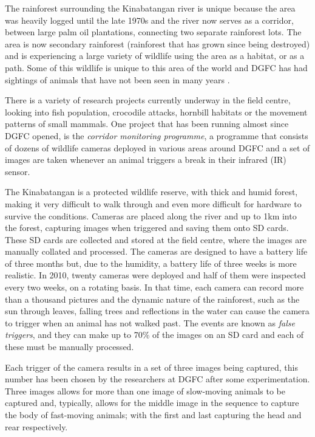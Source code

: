 The rainforest surrounding the Kinabatangan river is unique because the area was heavily logged until the late 1970s and the river now serves as a corridor, between large palm oil plantations, connecting two separate rainforest lots. The area is now secondary rainforest (rainforest that has grown since being destroyed) and is experiencing a large variety of wildlife using the area as a habitat, or as a path. Some of this wildlife is unique to this area of the world and DGFC has had sightings of animals that have not been seen in many years \cite{Goossens2012}.

There is a variety of research projects currently underway in the field centre, looking into fish population, crocodile attacks, hornbill habitats or the movement patterns of small mammals. One project that has been running almost since DGFC opened, is the \textit{corridor monitoring programme}, a programme that consists of dozens of wildlife cameras deployed in various areas around DGFC and a set of images are taken whenever an animal triggers a break in their infrared (IR)  sensor.

The Kinabatangan is a protected wildlife reserve, with thick and humid forest, making it very difficult to walk through and even more difficult for hardware to survive the conditions. Cameras are placed along the river and up to 1km into the forest, capturing images when triggered and saving them onto SD cards. These SD cards are collected and stored at the field centre, where the images are manually collated and processed. The cameras are designed to have a battery life of three months but, due to the humidity, a battery life of three weeks is more realistic. In 2010, twenty cameras were deployed and half of them were inspected every two weeks, on a rotating basis. In that time, each camera can record more than a thousand pictures and the dynamic nature of the rainforest, such as the sun through leaves, falling trees and reflections in the water can cause the camera to trigger when an animal has not walked past. The events are known as \textit{false triggers}, and they can make up to 70\% of the images on an SD card and each of these must be manually processed. 

Each trigger of the camera results in a set of three images being captured, this number has been chosen by the researchers at DGFC after some experimentation. Three images allows for more than one image of slow-moving animals to be captured and, typically, allows for the middle image in the sequence to capture the body of fast-moving animals; with the first and last capturing the head and rear respectively.

